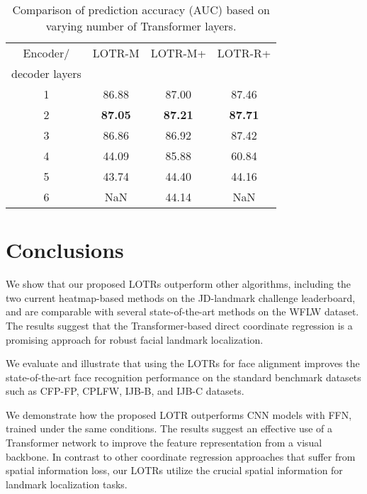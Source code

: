 \documentclass[journal]{IEEEtran}
\begin{document}
\begin{table}
\caption{Comparison of prediction accuracy (AUC) based on varying number of Transformer layers.}
\centering
\begin{tabular}{cccc}
\hline
Encoder/       & LOTR-M & LOTR-M+ & LOTR-R+ \\
decoder layers &        &         &         \\
\hline
1              &         86.88  &          87.00   &          87.46   \\
2              & \textbf{87.05} &  \textbf{87.21}  &  \textbf{87.71}   \\
3              &         86.86  &          86.92   &          87.42   \\
4              &         44.09  &          85.88   &          60.84   \\
5              &         43.74  &          44.40   &          44.16   \\
6              &         NaN    &          44.14   &          NaN     \\
\hline
\end{tabular}
\par
\label{tab:tf_layer}
\end{table}



\section{Conclusions}\label{sec:conclusion}

We show that our proposed LOTRs outperform other algorithms, including the two current heatmap-based methods on the JD-landmark challenge leaderboard, and are comparable with several state-of-the-art methods on the WFLW dataset.
The results suggest that the Transformer-based direct coordinate regression is a promising approach for robust facial landmark localization.

We evaluate and illustrate that using the LOTRs for face alignment improves the state-of-the-art face recognition performance on the standard benchmark datasets such as CFP-FP, CPLFW, IJB-B, and IJB-C datasets.

We demonstrate how the proposed LOTR outperforms CNN models with FFN, trained under the same conditions. 
The results suggest an effective use of a Transformer network to improve the feature representation from a visual backbone. 
In contrast to other coordinate regression approaches that suffer from spatial information loss, our LOTRs utilize the crucial spatial information for landmark localization tasks.
\end{document}
